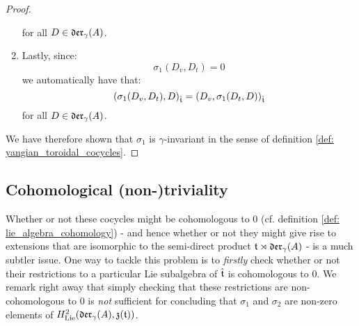 \begin{proof}
\begin{enumerate}
                    for all $D \in \mathfrak{der}_{\gamma}(A)$.
                    \item Lastly, since:
                        $$\sigma_1(D_v, D_t) = 0$$
                    we automatically have that:
                        $$( \sigma_1(D_v, D_t), D )_{\hat{\mathfrak{t}}} = ( D_v, \sigma_1(D_t, D) )_{\hat{\mathfrak{t}}}$$
                    for all $D \in \mathfrak{der}_{\gamma}(A)$.
                \end{enumerate}
                We have therefore shown that $\sigma_1$ is $\gamma$-invariant in the sense of definition \ref{def: yangian_toroidal_cocycles}. 
            \end{proof}

    \subsection{Cohomological (non-)triviality}
        Whether or not these cocycles might be cohomologous to $0$ (cf. definition \ref{def: lie_algebra_cohomology}) - and hence whether or not they might give rise to extensions that are isomorphic to the semi-direct product $\mathfrak{t} \rtimes \mathfrak{der}_{\gamma}(A)$ - is a much subtler issue. One way to tackle this problem is to \textit{firstly} check whether or not their restrictions to a particular Lie subalgebra of $\hat{\mathfrak{t}}$ is cohomologous to $0$. We remark right away that simply checking that these restrictions are non-cohomologous to $0$ is \textit{not} sufficient for concluding that $\sigma_1$ and $\sigma_2$ are non-zero elements of $H^2_{\mathrm{Lie}}(\mathfrak{der}_{\gamma}(A), \mathfrak{z}(\mathfrak{t}))$.
        
